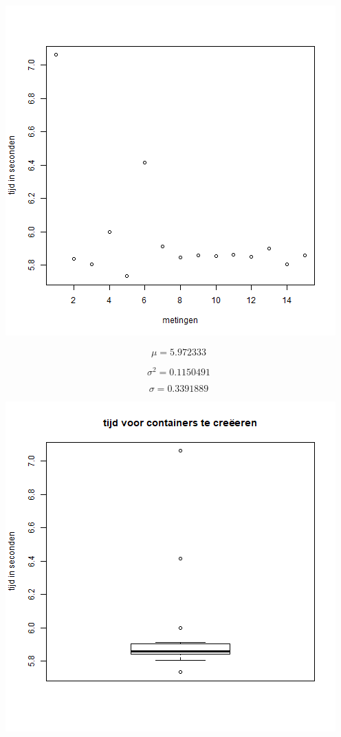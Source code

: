 \begin{center}
	\includegraphics[scale=0.5]{img/centosplotprovision.png}
\end{center}

\[ \mu = 5.972333 \]

\[ \sigma^2 = 0.1150491 \]

\[ \sigma = 0.3391889 \]

\begin{center}
	\includegraphics[scale=0.5]{img/centosboxplotprovision.png}
\end{center}


